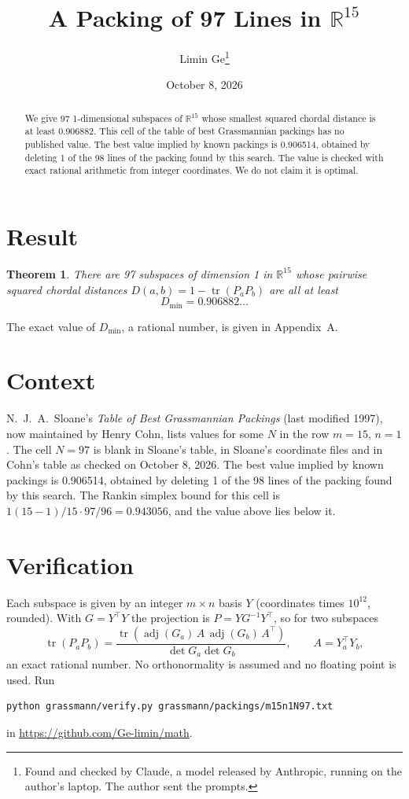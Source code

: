\documentclass[11pt,a4paper]{article}
\title{A Packing of 97 Lines in $\mathbb{R}^{15}$}
\author{Limin Ge\thanks{Found and checked by Claude, a model released by Anthropic, running on the author's laptop. The author sent the prompts.}}
\date{October 8, 2026}
\newtheorem*{theorem}{Theorem}
\begin{document}
\maketitle
\begin{abstract}
We give 97 1-dimensional subspaces of $\mathbb{R}^{15}$ whose smallest squared chordal distance is at least 0.906882. This cell of the table of best Grassmannian packings has no published value. The best value implied by known packings is 0.906514, obtained by deleting 1 of the 98 lines of the packing found by this search. The value is checked with exact rational arithmetic from integer coordinates. We do not claim it is optimal.
\end{abstract}

\section{Result}
\begin{theorem}
There are 97 subspaces of dimension 1 in $\mathbb{R}^{15}$ whose pairwise squared chordal distances $D(a,b) = 1 - \operatorname{tr}(P_aP_b)$ are all at least
\[ D_{\min} = 0.906882\ldots \]
\end{theorem}
The exact value of $D_{\min}$, a rational number, is given in Appendix~A.


\section{Context}
N.~J.~A.~Sloane's \emph{Table of Best Grassmannian Packings} (last modified 1997), now maintained by Henry Cohn, lists values for some $N$ in the row $m=15$, $n=1$. The cell $N=97$ is blank in Sloane's table, in Sloane's coordinate files and in Cohn's table as checked on October 8, 2026. The best value implied by known packings is 0.906514, obtained by deleting 1 of the 98 lines of the packing found by this search. The Rankin simplex bound for this cell is $1(15-1)/15\cdot 97/96 = 0.943056$, and the value above lies below it.


\section{Verification}
Each subspace is given by an integer $m\times n$ basis $Y$ (coordinates times $10^{12}$, rounded). With $G=Y^\top Y$ the projection is $P=YG^{-1}Y^\top$, so for two subspaces
\[ \operatorname{tr}(P_aP_b)=\frac{\operatorname{tr}(\operatorname{adj}(G_a)\,A\,\operatorname{adj}(G_b)\,A^\top)}{\det G_a\det G_b},\qquad A=Y_a^\top Y_b, \]
an exact rational number. No orthonormality is assumed and no floating point is used. Run
\begin{verbatim}
python grassmann/verify.py grassmann/packings/m15n1N97.txt
\end{verbatim}
in \url{https://github.com/Ge-limin/math}.
\end{document}
